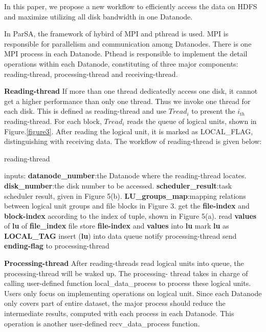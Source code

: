 \documentclass[preprint,12pt]{elsarticle}
\begin{document}
In this paper, we propose a new workflow to efficiently access the data on HDFS and maximize utilizing all disk bandwidth in one 
Datanode. \par
In ParSA, the framework of hybird of MPI and pthread is used. MPI is responsible for parallelism and communication among Datanodes. There
is one MPI process in each Datanode. Pthead is responsible to implement the detail operations within each Datanode, constituting of 
three major components: reading-thread, processing-thread and receiving-thread. \par
\textbf{Reading-thread} If more than one thread dedicatedly access one disk, it cannot get a higher performance than only one thread. 
Thus we invoke one thread for each disk. This is defined as reading-thread and use $Tread_i$ to present the $i_{th}$ reading-thread. 
For each block, $Tread_i$ reads the queue of logical units, shown in Figure.\ref{figure3}. After reading the logical unit, it is 
marked as LOCAL\_FLAG, distinguishing with receiving data. The workflow of reading-thread is given below:

\begin{algorithm}[htb]
\caption{reading-thread} 
\label{alg:reading-thread}
\begin{algorithmic}
\STATE inputs:
\STATE \textbf{datanode\_number}:the Datanode where the reading-thread locates.
\STATE \textbf{disk\_number}:the disk number to be accessed. 
\STATE \textbf{scheduler\_result}:task scheduler result, given in Figure 5(b).
\STATE \textbf{LU\_groups\_map}:mapping relations between logical unit groups and file blocks in Figure 3.
\newline
{} 
\STATE get the \textbf{file-index} and \textbf{block-index} according to the index of tuple, shown in Figure 5(a).
\STATE read \textbf{values} of \textbf{lu} of \textbf{file\_index} file
\STATE store \textbf{file-index} and \textbf{values} into \textbf{lu}
\STATE mark \textbf{lu} as \textbf{LOCAL\_TAG}
\STATE insert (\textbf{lu}) into data queue
\STATE notify processing-thread
\ENDFOR
\ENDIF
\ENDFOR
\STATE send \textbf{ending-flag} to processing-thread
\end{algorithmic}
\end{algorithm}

\textbf{Processing-thread} After reading-threads read logical units into queue, the processing-thread will be waked up. The processing-
thread takes in charge of calling user-defined function local\_data\_process to process these logical units. Users only focus on 
implementing operations on logical unit. Since each Datanode only covers part of entire dataset, the major process should reduce the 
intermediate results, computed with each process in each Datanode. This operation is another user-defined recv\_data\_process function. 
\end{document}
